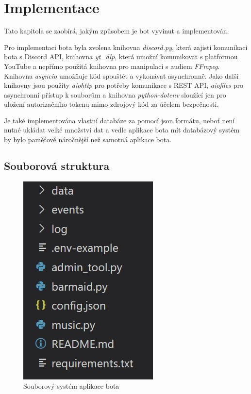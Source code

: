 \documentclass[
  program=inf,
biblatex=false,
sourcecodes=true,
joinlists=true,
  figures=true,
  tables=true,
  glossaries=true,
  index=false
]{kidiplom}
\begin{document}
\newpage
\section{Implementace}
Tato kapitola se zaobírá, jakým způsobem je bot vyvinut a implementován. 

Pro implementaci
bota byla zvolena knihovna {\it discord.py}, která zajistí komunikaci bota s Discord API, knihovna
{\it yt\_dlp}, která umožní komunikovat s platformou YouTube a nepřímo použitá knihovna pro manipulaci s audiem {\it FFmpeg}. 
Knihovna {\it asyncio} umožňuje kód spouštět a vykonávat asynchronně. Jako další knihovny jsou použity 
{\it aiohttp} pro potřeby komunikace s REST API, {\it aiofiles} pro asynchronní přístup k souborům a knihovna {\it python-dotenv}
sloužící jen pro uložení autorizačního tokenu mimo zdrojový kód za účelem bezpečnosti.

Je také implementována vlastní databáze za pomocí \acrshort{json} formátu, neboť není nutné ukládat
velké množství dat a vedle aplikace bota mít databázový systém by bylo paměťově náročnější než samotná aplikace bota.

\subsection{Souborová struktura}

\begin{figure}[h]
  \centering \includegraphics[scale=1]{filesystem}
  \caption{\label{files}Souborový systém aplikace bota}
\end{figure}
\end{document}
